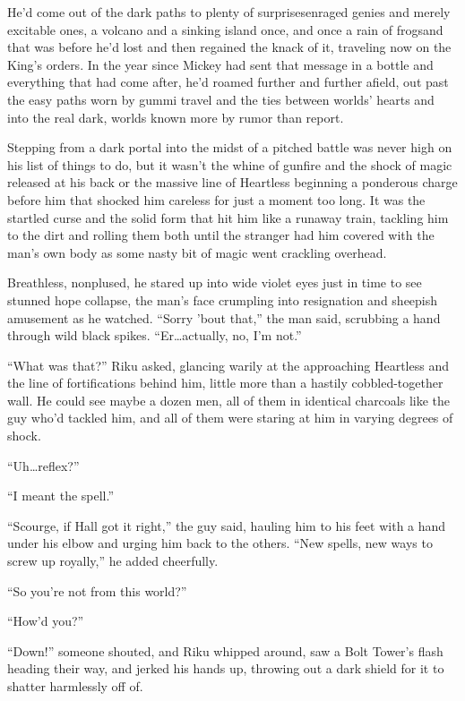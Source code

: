 He'd come out of the dark paths to plenty of surprises\textemdash enraged genies and merely excitable ones, a volcano and a sinking island once, and once a rain of frogs\textemdash and that was before he'd lost and then regained the knack of it, traveling now on the King's orders. In the year since Mickey had sent that message in a bottle and everything that had come after, he'd roamed further and further afield, out past the easy paths worn by gummi travel and the ties between worlds' hearts and into the real dark, worlds known more by rumor than report.

Stepping from a dark portal into the midst of a pitched battle was never high on his list of things to do, but it wasn't the whine of gunfire and the shock of magic released at his back or the massive line of Heartless beginning a ponderous charge before him that shocked him careless for just a moment too long. It was the startled curse and the solid form that hit him like a runaway train, tackling him to the dirt and rolling them both until the stranger had him covered with the man's own body as some nasty bit of magic went crackling overhead.

Breathless, nonplused, he stared up into wide violet eyes just in time to see stunned hope collapse, the man's face crumpling into resignation and sheepish amusement as he watched.
``Sorry 'bout that,'' the man said, scrubbing a hand through wild black spikes. ``Er\ldots actually, no, I'm not.''

``What was that?'' Riku asked, glancing warily at the approaching Heartless and the line of fortifications behind him, little more than a hastily cobbled-together wall. He could see maybe a dozen men, all of them in identical charcoals like the guy who'd tackled him, and all of them were staring at him in varying degrees of shock.

``Uh\ldots reflex?''

``I meant the spell.''

``Scourge, if Hall got it right,'' the guy said, hauling him to his feet with a hand under his elbow and urging him back to the others. ``New spells, new ways to screw up royally,'' he added cheerfully.

``So you're not from this world?''

``How'd you\textemdash ?''

``Down!'' someone shouted, and Riku whipped around, saw a Bolt Tower's flash heading their way, and jerked his hands up, throwing out a dark shield for it to shatter harmlessly off of.

